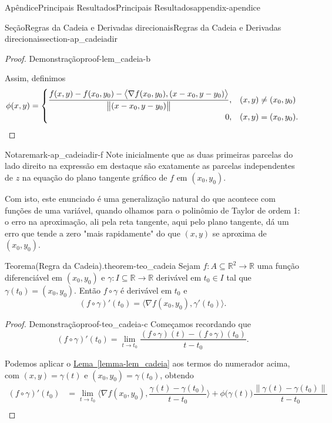 \documentclass[oneside,10pt,]{book}
\newcommand{\xreffont}{\relax}
\numberwithin{equation}{section}
\newcommand{\qedhere}{\relax}
\newcommand{\R}{\mathbb R}
\begin{document}
\begin{appendixptx}{Apêndice}{Principais Resultados}{}{Principais Resultados}{}{}{appendix-apendice}
\begin{sectionptx}{Seção}{Regras da Cadeia e Derivadas direcionais}{}{Regras da Cadeia e Derivadas direcionais}{}{}{section-ap_cadeiadir}
\begin{proof}{Demonstração}{}{proof-lem_cadeia-b}
\par
Assim, definimos%
\begin{equation*}
\phi(x,y)=\begin{cases}
\dfrac{f(x,y)-f(x_0,y_0)-\big\langle\nabla
f(x_0,y_0),(x-x_0,y-y_0)\big\rangle}{\big\|(x-x_0,y-y_0)\big\|},&(x,y)\neq
(x_0,y_0)\\
\hfill 0,& (x,y)=(x_0,y_0).
\end{cases}\qedhere
\end{equation*}
%
\end{proof}
\begin{remark}{Nota}{}{remark-ap_cadeiadir-f}%
Note inicialmente que as duas primeiras parcelas do lado direito na expressão em destaque são exatamente as parcelas independentes de \(z\) na equação do plano tangente gráfico de \(f\) em \((x_0,y_0)\).%
\par
Com isto, este enunciado é uma generalização natural do que acontece com funções de uma variável, quando olhamos para o polinômio de Taylor de ordem 1: o erro na aproximação, ali pela reta tangente, aqui pelo plano tangente, dá um erro que tende a zero "mais rapidamente" do que \((x,y)\) se aproxima de \((x_0,y_0)\).%
\end{remark}
\begin{theorem}{Teorema}{(Regra da Cadeia).}{}{theorem-teo_cadeia}%
Sejam \(f\colon A\subseteq\R^2\to\R\) uma função diferenciável em \((x_0,y_0)\) e \(\gamma\colon
I\subseteq\R\to\R\) derivável em \(t_0\in I\) tal que \(\gamma(t_0)=(x_0,y_0)\). Então \(f\circ\gamma \) é derivável em \(t_0\) e%
\begin{equation*}
(f\circ\gamma)'(t_0)=\big\langle\nabla
f(x_0,y_0),\gamma'(t_0)\big\rangle.
\end{equation*}
%
\end{theorem}
\begin{proof}{Demonstração}{}{proof-teo_cadeia-c}
Começamos recordando que%
\begin{equation*}
(f\circ\gamma)'(t_0)=\lim\limits_{t\to t_0}
\dfrac{(f\circ\gamma)(t)-(f\circ\gamma)(t_0)}{t-t_0}.
\end{equation*}
%
\par
Podemos aplicar o \hyperref[lemma-lem_cadeia]{Lema~{\xreffont\ref{lemma-lem_cadeia}}} aos termos do numerador acima, com \((x,y)=\gamma(t)\) e \((x_0,y_0)=\gamma(t_0)\), obtendo%
\begin{align*}
(f\circ\gamma)'(t_0)&
=\lim\limits_{t\to t_0}\big\langle\nabla
f(x_0,y_0),\dfrac{\gamma(t)-\gamma(t_0)}{t-t_0}\big\rangle+\phi\big(\gamma(t)\big)\dfrac{\big\|\gamma(t)-\gamma(t_0)\big\|}{t-t_0}\\

\end{align*}
\end{proof}
\end{sectionptx}
\end{appendixptx}
\end{document}
